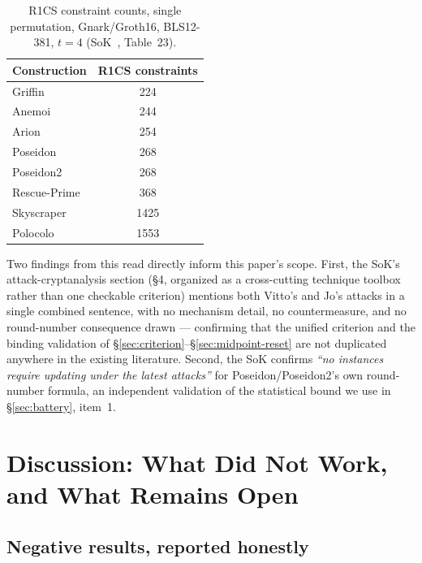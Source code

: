 \documentclass[11pt]{article}
\begin{document}
\begin{table}[h!]
\centering
\caption{R1CS constraint counts, single permutation, Gnark/Groth16,
BLS12-381, $t=4$ (SoK~\cite{sok2026}, Table~23).}
\label{tab:sok}
\begin{tabular}{@{}lc@{}}
\toprule
Construction & R1CS constraints \\
\midrule
Griffin & 224 \\
Anemoi~\cite{anemoi2022} & 244 \\
Arion & 254 \\
Poseidon & 268 \\
Poseidon2 & 268 \\
Rescue-Prime & 368 \\
Skyscraper & 1425 \\
Polocolo~\cite{polocolo2025} & 1553 \\
\bottomrule
\end{tabular}
\end{table}

Two findings from this read directly inform this paper's scope. First,
the SoK's attack-cryptanalysis section (\S4, organized as a cross-cutting
technique toolbox rather than one checkable criterion) mentions both
Vitto's and Jo's attacks in a single combined sentence, with no mechanism
detail, no countermeasure, and no round-number consequence drawn ---
confirming that the unified criterion and the binding validation of
\S\ref{sec:criterion}--\S\ref{sec:midpoint-reset} are not duplicated
anywhere in the existing literature. Second, the SoK confirms
\emph{``no instances require updating under the latest attacks''} for
Poseidon/Poseidon2's own round-number formula, an independent validation
of the statistical bound we use in \S\ref{sec:battery}, item~1.

\section{Discussion: What Did Not Work, and What Remains Open}
\label{sec:discussion}
\label{sec:levers}

\subsection{Negative results, reported honestly}
\end{document}
